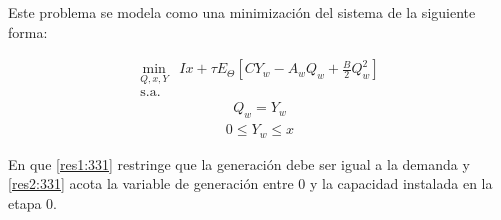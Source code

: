 Este problema se modela como una minimización del sistema de la siguiente forma:

\begin{equation}
\begin{array}{rrclcl}
    \displaystyle \min_{Q,x,Y} & Ix+\tau E_{\Theta}[CY_w-A_wQ_w+\frac{B}{2}Q_w^2]  \\\textrm{s.a.} \label{eq:331}
\end{array}
\end{equation}
\begin{equation}
\begin{array}{cl}
    Q_w=Y_w \label{res1:331}
\end{array}
\end{equation}
\begin{equation}
\begin{array}{cl}
   0\leq Y_w \leq x\label{res2:331}
\end{array}
\end{equation}

En que \ref{res1:331} restringe que la generación debe ser igual a la demanda y \ref{res2:331} acota la variable de generación entre 0 y la capacidad instalada en la etapa 0.

